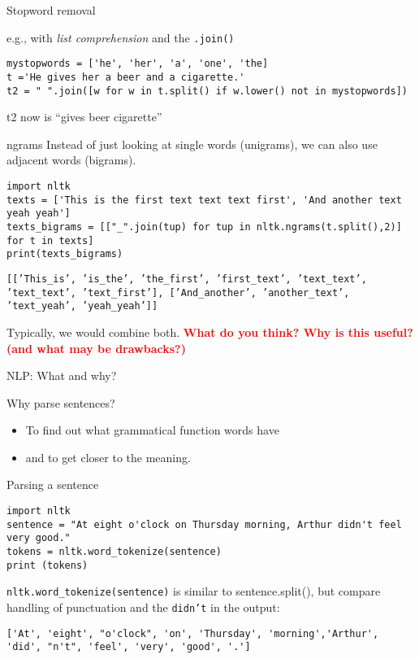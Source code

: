 \documentclass[compress]{beamer}
\begin{document}
\begin{frame}[fragile]{Stopword removal}

e.g., with \textit{list comprehension} and the \texttt{.join()}

\begin{lstlisting}
mystopwords = ['he', 'her', 'a', 'one', 'the]
t ='He gives her a beer and a cigarette.'
t2 = " ".join([w for w in t.split() if w.lower() not in mystopwords])
\end{lstlisting}

t2 now is ``gives beer cigarette''

\end{frame}



\begin{frame}[fragile]{ngrams}
Instead of just looking at single words (unigrams), we can also use adjacent words (bigrams).
\begin{lstlisting}
import nltk
texts = ['This is the first text text text first', 'And another text yeah yeah']
texts_bigrams = [["_".join(tup) for tup in nltk.ngrams(t.split(),2)] for t in texts]
print(texts_bigrams)
\end{lstlisting}
\texttt{[['This\_is',
	'is\_the',
	'the\_first',
	'first\_text',
	'text\_text',
	'text\_text',
	'text\_first'],
	['And\_another', 'another\_text', 'text\_yeah', 'yeah\_yeah']]
}

Typically, we would combine both.
\pause
\textbf{\textcolor{red}{What do you think? Why is this useful? (and what may be drawbacks?)}}
\end{frame}



\begin{frame}{NLP: What and why?}
\begin{block}{Why parse sentences?}
\begin{itemize}
\item To find out what grammatical function words have
\item and to get closer to the meaning.
\end{itemize}
\end{block}
\end{frame}

\begin{frame}[fragile]{Parsing a sentence}
\begin{lstlisting}
import nltk
sentence = "At eight o'clock on Thursday morning, Arthur didn't feel very good."
tokens = nltk.word_tokenize(sentence)
print (tokens)
\end{lstlisting}

\texttt{nltk.word\_tokenize(sentence)} is similar to sentence.split(), but compare handling of punctuation and the \texttt{didn't} in the output:
\begin{lstlisting}
['At', 'eight', "o'clock", 'on', 'Thursday', 'morning','Arthur', 'did', "n't", 'feel', 'very', 'good', '.']
\end{lstlisting}
\end{frame}
\end{document}
